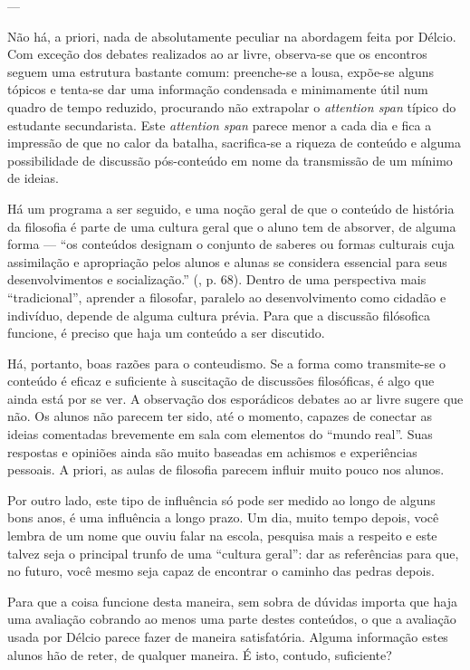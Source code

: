 \documentclass[12pt,a4paper]{article}
\begin{document}
---


	Não há, a priori, nada de absolutamente peculiar na abordagem feita por 
	Délcio. Com exceção dos debates realizados ao ar livre, observa-se que 
	os encontros seguem uma estrutura bastante comum: preenche-se a lousa, 
	expõe-se alguns tópicos e tenta-se dar uma informação condensada e 
	minimamente útil num quadro de tempo reduzido, procurando não extrapolar 
	o \textit{attention span} típico do estudante secundarista. Este 
	\textit{attention span} parece menor a cada dia e fica a impressão de que 
	no calor da batalha, sacrifica-se a riqueza de conteúdo e alguma 
	possibilidade de discussão pós-conteúdo em nome da transmissão de um 
	mínimo de ideias. 
	
	Há um programa a ser seguido, e uma noção geral de que o conteúdo 
	de história da filosofia é parte de uma cultura geral que o aluno tem de 
	absorver, de alguma forma --- ``os conteúdos designam o conjunto de 
	saberes ou formas culturais cuja assimilação e apropriação pelos alunos e 
	alunas se considera essencial para seus desenvolvimentos e socialização.'' 
	(\cite{obiols}, p. 68). Dentro de uma perspectiva mais ``tradicional'', 
	aprender a filosofar, paralelo ao desenvolvimento como cidadão e 
	indivíduo, depende de alguma cultura prévia. Para que a discussão 
	filósofica funcione, é preciso que haja um conteúdo a ser discutido. 
	
	Há, portanto, boas razões para o conteudismo. Se a forma como transmite-se 
	o conteúdo é eficaz e suficiente à suscitação de discussões filosóficas, é 
	algo que ainda está por se ver. A observação dos esporádicos debates ao ar 
	livre sugere que não. Os alunos não parecem ter sido, até o momento, 
	capazes de conectar as ideias comentadas brevemente em sala com elementos 
	do ``mundo real''. Suas respostas e opiniões ainda são muito baseadas em 
	achismos e experiências pessoais. A priori, as aulas de filosofia parecem 
	influir muito pouco nos alunos. 
	
	Por outro lado, este tipo de influência só pode ser medido ao longo de 
	alguns bons anos, é uma influência a longo prazo. Um dia, muito tempo 
	depois, você lembra de um nome que ouviu falar na escola, pesquisa mais a 
	respeito 	e este talvez seja o principal trunfo de uma 
	``cultura geral'': dar as referências para que, no futuro, você mesmo seja 
	capaz de encontrar o caminho das pedras depois. 

	Para que a coisa funcione desta maneira, sem sobra de dúvidas importa que 
	haja uma avaliação cobrando ao menos uma parte destes conteúdos, o que a 
	avaliação usada por Délcio parece fazer de maneira satisfatória. Alguma 
	informação estes alunos hão de reter, de qualquer maneira. É isto, contudo, 
	suficiente? 
	
\end{document}
